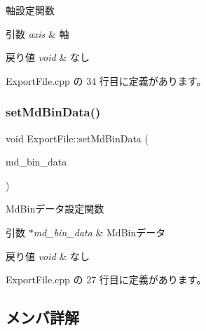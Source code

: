 軸設定関数 


\begin{DoxyParams}{引数}
{\em axis} & 軸 \\
\hline
\end{DoxyParams}

\begin{DoxyRetVals}{戻り値}
{\em void} & なし \\
\hline
\end{DoxyRetVals}


 Export\+File.\+cpp の 34 行目に定義があります。

\mbox{\label{class_export_file_a8b1ef14ae42180a8bf491d4d7a4ceb63}} 
\subsubsection{\texorpdfstring{set\+Md\+Bin\+Data()}{setMdBinData()}}
{\footnotesize\ttfamily void Export\+File\+::set\+Md\+Bin\+Data (\begin{DoxyParamCaption}\item[{\mbox{\hyperlink{class_md_bin_data}{Md\+Bin\+Data}} $\ast$}]{md\+\_\+bin\+\_\+data }\end{DoxyParamCaption})}



Md\+Binデータ設定関数 


\begin{DoxyParams}{引数}
{\em $\ast$md\+\_\+bin\+\_\+data} & Md\+Binデータ \\
\hline
\end{DoxyParams}

\begin{DoxyRetVals}{戻り値}
{\em void} & なし \\
\hline
\end{DoxyRetVals}


 Export\+File.\+cpp の 27 行目に定義があります。



\subsection{メンバ詳解}
\mbox{\label{class_export_file_aa07d09fbe2283f5b69a3d001ce6bcc4c}} 
